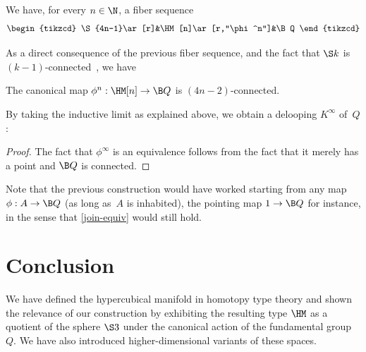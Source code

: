 \documentclass[a4paper]{article}
\begin{document}
\begin{proposition}
  We have, for every $n\in\N$, a fiber sequence
  \[
    \begin{tikzcd}
      \S{4n-1}\ar[r]&\HM[n]\ar[r,"\phi^n"]&\B Q
    \end{tikzcd}
  \]
\end{proposition}

\noindent
As a direct consequence of the previous fiber sequence, and the fact that $\S k$ is $(k{-}1)$-connected~\cite[Corollary 8.2.2]{hottbook}, we have

\begin{proposition}
  The canonical map $\phi^n:\HM[n]\to\B Q$ is $(4n{-}2)$-connected.
\end{proposition}

\noindent
By taking the inductive limit as explained above, we obtain a delooping $K^\infty$ of~$Q$:

\begin{proof}
  The fact that $\phi^\infty$ is an equivalence follows from the fact that it merely has a point and $\B Q$ is connected.
\end{proof}


\begin{remark}
  Note that the previous construction would have worked starting from any map $\phi:A\to\B Q$ (as long as~$A$ is inhabited), the pointing map $1\to\B Q$ for instance, in the sense that \cref{join-equiv} would still hold.
\end{remark}

\section{Conclusion}
\label{sec:conclusion}
We have defined the hypercubical manifold in homotopy type theory and shown the relevance of our construction by exhibiting the resulting type $\HM$ as a quotient of the sphere $\S3$ under the canonical action of the fundamental group~$Q$. We have also introduced higher-dimensional variants of these spaces.
\end{document}
